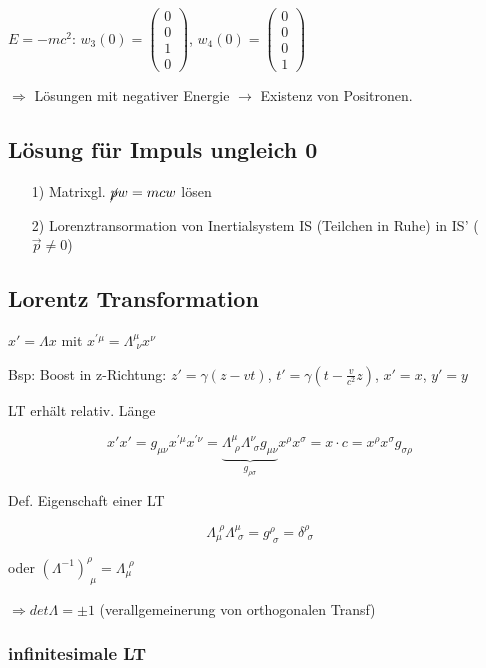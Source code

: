\(E=-mc^2\): \(w_3(0) =  \begin{pmatrix}0\\0\\1\\0\end{pmatrix}\), \(w_4(0) =  \begin{pmatrix}0\\0\\0\\1\end{pmatrix}\)

\(\Rightarrow \) Lösungen mit negativer Energie \(\rightarrow \) Existenz von Positronen. 

\subsection{Lösung für Impuls ungleich 0}

\begin{enumerate}
\item[1)] Matrixgl. \(\cancel p w = mcw\) lösen
\item[2)] Lorenztransormation von Inertialsystem IS (Teilchen in Ruhe) in IS' (\(\vec p\neq 0\))
\end{enumerate}

\subsection{Lorentz Transformation}

\(x' = \Lambda x\)  mit \(x^{'\mu}=\Lambda^\mu_{\,\, \nu}x^\nu\)

Bsp: Boost in z-Richtung: \(z' = \gamma(z-vt)\), \(t' = \gamma(t-\frac{v}{c^2}z)\), \(x' = x\), \(y'=y\)

LT erhält relativ. Länge

\[x'x' = g_{\mu\nu}x^{'\mu}x^{'\nu} = \underbrace{\Lambda^\mu_{\,\, \rho}  \Lambda^\nu_{\,\, \sigma}g_{\mu\nu}}_{g_{\rho\sigma}}x^\rho x^\sigma = x\cdot c = x^\rho x^\sigma g_{\sigma\rho}\]

Def. Eigenschaft einer LT

\[\Lambda_\mu^{\,\, \rho}\Lambda^\mu_{\,\,\sigma} = g^\rho_{\,\,\sigma} = \delta^\rho_{\,\, \sigma}  \]

oder \((\Lambda^{-1})^\rho_{\,\,\mu} = \Lambda_\mu^{\,\,\rho}\)

\(\Rightarrow det\Lambda = \pm 1\) (verallgemeinerung von orthogonalen Transf)

\subsubsection{infinitesimale LT}

